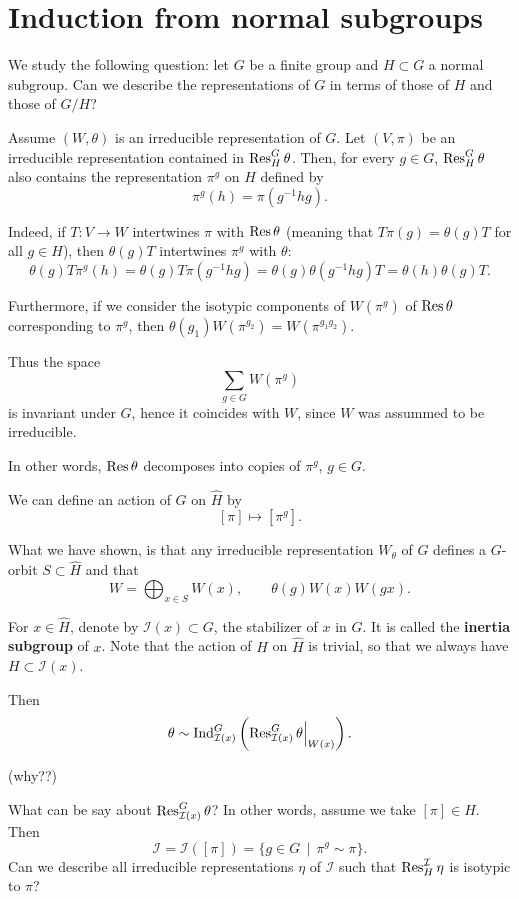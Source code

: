 \documentclass[11pt, english]{article}
\begin{document}
\newpage
\section{Induction from normal subgroups}

We study the following question: let $G$ be a finite group and $H \subset G$ a normal subgroup. Can we describe the representations of $G$ in terms of those of $H$ and those of $G/H$? 

Assume $(W,\theta)$ is an irreducible representation of $G$. Let $(V,\pi)$ be an irreducible representation contained in $\operatorname{Res}_H^G \theta$. Then, for every $g \in G$, $\operatorname{Res}_H^G \theta$ also contains the representation $\pi^g$ on $H$ defined by 
$$
\pi^g(h) = \pi(g^{-1}hg).
$$

Indeed, if $T:V \to W$ intertwines $\pi$ with $\operatorname{Res} \theta$ (meaning that $T \pi(g)= \theta(g) T$ for all $g \in H$), then $\theta(g) T $ intertwines $\pi^g$ with $\theta$:
$$
\theta(g) T \pi^g(h) = \theta(g) T \pi(g^{-1}hg) = \theta(g) \theta(g^{-1} h g) T = \theta(h) \theta(g) T.
$$

Furthermore, if we consider the isotypic components of $W(\pi^g)$ of $\operatorname{Res} \theta$ corresponding to $\pi^g$, then $\theta(g_1) W(\pi^{g_2}) = W(\pi^{g_1g_2})$. 

Thus the space
$$
\sum_{g \in G} W(\pi^g)
$$
is invariant under $G$, hence it coincides with $W$, since $W$ was assummed to be irreducible.

In other words, $\operatorname{Res} \theta$ decomposes into copies of $\pi^g$, $g \in G$.

We can define an action of $G$ on $\widehat H$ by 
$$
[\pi] \mapsto [\pi^g].
$$

What we have shown, is that any irreducible representation $W_\theta$ of $G$ defines a $G$-orbit $S \subset \widehat H$ and that
$$
W = \bigoplus_{x \in S} W(x), \qquad \theta(g) W(x) W(gx).
$$


For $x \in \widehat H$, denote by $\mathcal I(x) \subset G$, the stabilizer of $x$ in $G$. It is called the \textbf{inertia subgroup} of $x$. Note that the action of $H$ on $\widehat H$ is trivial, so that we always have $H \subset \mathcal I(x)$.

Then
$$
\theta \sim \Ind_{\mathcal I(x)}^G \left( \restr{\Res_{\mathcal I(x)}^G \theta }{W(x)}\right).
$$

(why??) 

What can be say about $\operatorname{Res}_{\mathcal I(x)}^G \theta$? In other words, assume we take $[\pi] \in \widehat H$. Then
$$
\mathcal I = \mathcal I([\pi]) = \{ g \in G \, \mid \, \pi^g \sim \pi \}.
$$
Can we describe all irreducible representations $\eta$ of $\mathcal I$ such that $\operatorname{Res}_H^{\mathcal I} \eta$ is isotypic to $\pi$?
\end{document}
